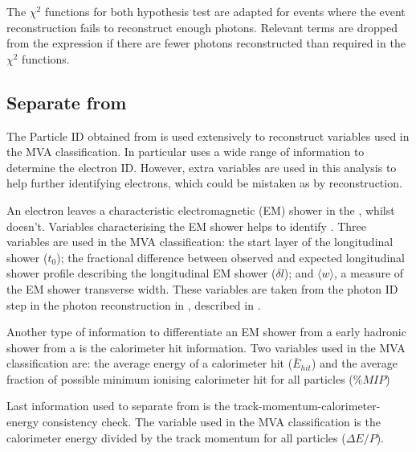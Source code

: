 
The $\chi^{2}$ functions for both hypothesis test are adapted for events where the event reconstruction fails to reconstruct enough photons. Relevant terms are dropped from the expression if there are fewer photons reconstructed  than required in the $\chi^{2}$ functions.

\subsection{Separate \decayElectronShort from \decayPionShort}

The Particle ID obtained from \pandora is used extensively to reconstruct variables used in the MVA classification. In particular \pandora uses a wide range of information to determine the electron ID. However, extra variables are used in this analysis to help further identifying electrons, which could be mistaken as \Pgpm by \pandora reconstruction.

An electron leaves a characteristic electromagnetic  (EM) shower in the \ECAL, whilst \Pgpm doesn't. Variables characterising the  EM shower helps to identify \Pem. Three variables are used in the MVA classification: the start layer of the longitudinal shower ($t_0$); the fractional difference between observed and expected longitudinal shower profile describing the longitudinal EM shower ($\delta{l}$); and $\langle{w}\rangle$, a measure of the EM shower transverse width. These variables are  taken from the photon ID step in the photon reconstruction in \pandora, described in .

Another type of information to differentiate an EM shower from a early hadronic shower from a \Pgpm is the calorimeter hit information. Two variables used in the MVA classification are: the average energy of a calorimeter hit ($\bar{E}_{hit}$) and the average fraction of possible minimum ionising calorimeter hit for all particles ($\%MIP$)

Last information used to separate \Pem from \Pgpm is the track-momentum-calorimeter-energy consistency check. The variable used in the MVA classification is the calorimeter energy divided by the track momentum for all particles ($\Delta E/P$).


